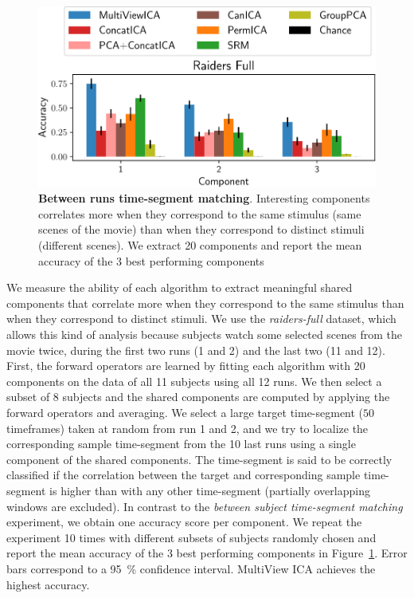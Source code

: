 \documentclass[12pt]{report}
\begin{document}
\begin{figure}
  \centering
  \includegraphics[width=\textwidth]{figures/mvica/swetha_exp_full_fit.pdf}
  \caption{\textbf{Between runs time-segment matching}. Interesting components correlates more when they correspond to the same stimulus (same scenes of the movie) than when they correspond to distinct stimuli (different scenes).
  We extract 20 components and report the mean accuracy of the 3 best performing components}
  \label{fig:swetha}
\end{figure}

We measure the ability of each algorithm to extract meaningful shared components that correlate more when they correspond to the same stimulus than when they correspond to distinct stimuli. We use the \emph{raiders-full} dataset, which allows this kind of analysis because subjects watch some selected scenes from the movie twice, during the first two runs (1 and 2) and the last two (11 and 12).
%
First, the forward operators are learned by fitting each algorithm with 20 components on the data of all 11 subjects using all 12 runs. We then select a subset of 8 subjects and the shared components are computed by applying the forward operators and averaging.
%
We select a large target time-segment ($50$
timeframes) taken at random from run 1 and 2, and we try to localize the corresponding sample time-segment from the 10 last runs using a single component of the shared components.
%
The time-segment is said to be
correctly classified if the correlation between the target and corresponding sample
time-segment is higher than with any other time-segment (partially overlapping windows are excluded).
%
In contrast to the \emph{between subject time-segment matching} experiment, we obtain one accuracy score per component.
%
We repeat the experiment 10 times with different subsets of subjects randomly chosen and report the mean accuracy of the 3 best performing components in Figure~\ref{fig:swetha}. Error bars correspond to a 95~\% confidence interval.
%
MultiView ICA achieves the highest accuracy.
\end{document}
